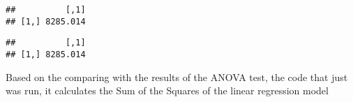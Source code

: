 \documentclass[12pt,]{article}
\newenvironment{Shaded}{\begin{snugshade}}{\end{snugshade}}
\newcommand{\KeywordTok}[1]{\textcolor[rgb]{0.13,0.29,0.53}{\textbf{#1}}}
\newcommand{\DecValTok}[1]{\textcolor[rgb]{0.00,0.00,0.81}{#1}}
\newcommand{\StringTok}[1]{\textcolor[rgb]{0.31,0.60,0.02}{#1}}
\newcommand{\OperatorTok}[1]{\textcolor[rgb]{0.81,0.36,0.00}{\textbf{#1}}}
\newcommand{\NormalTok}[1]{#1}
\begin{document}
\begin{Shaded}
\end{Shaded}

\begin{verbatim}
##          [,1]
## [1,] 8285.014
\end{verbatim}

\begin{verbatim}
##          [,1]
## [1,] 8285.014
\end{verbatim}

Based on the comparing with the results of the ANOVA test, the code that
just was run, it calculates the Sum of the Squares of the linear
regression model
\end{document}
